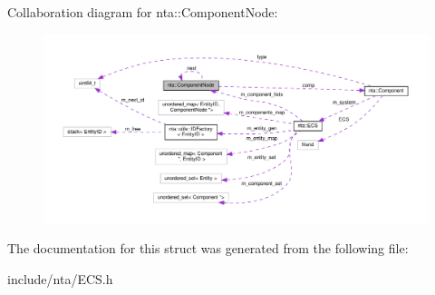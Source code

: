 Collaboration diagram for nta\+:\+:Component\+Node\+:
\nopagebreak
\begin{figure}[H]
\begin{center}
\leavevmode
\includegraphics[width=350pt]{dc/ddc/structnta_1_1ComponentNode__coll__graph}
\end{center}
\end{figure}


The documentation for this struct was generated from the following file\+:\begin{DoxyCompactItemize}
\item 
include/nta/E\+C\+S.\+h\end{DoxyCompactItemize}
